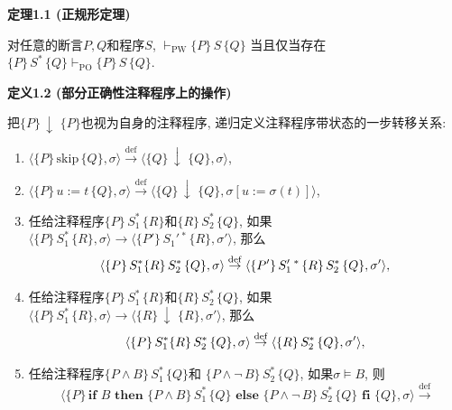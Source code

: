\documentclass[UTF8]{ctexart}
\begin{document}
\vspace{15pt}

\hypertarget{sec:定理1.1}{}
\noindent\textbf{定理1.1 (正规形定理)}

对任意的断言$P,Q$和程序$S$, $\vdash_{\mathrm{PW}}\{P\}\,S\,\{Q\}$
当且仅当存在$\{P\}\,S^*\,\{Q\}\vdash_{\mathrm{PO}}\{P\}\,S\,\{Q\}$.

\vspace{15pt}

\hypertarget{sec:定义1.2}{}
\noindent\textbf{定义1.2 (部分正确性注释程序上的操作)}

把$\{P\}\,\downarrow\,\,\{P\}$也视为自身的注释程序,
递归定义注释程序带状态的一步转移关系:
\begin{enumerate}
    \item $\langle\{P\}\,\mathrm{skip}\,\{Q\},\sigma\rangle
    \overset{\mathrm{def}}{\to}
    \langle\{Q\}\,\downarrow\,\,\{Q\},\sigma\rangle$,
    \item $\langle\{P\}\,u:=t\,\{Q\},\sigma\rangle\overset{\mathrm{def}}{\to}
    \langle\{Q\}\,\downarrow\,\,\{Q\},\sigma[u:=\sigma(t)]\rangle$,
    \vspace{3pt}
    \item 任给注释程序$\{P\}\,S_1^*\,\{R\}$和$\{R\}\,S_2^*\,\{Q\}$,
    如果$\langle\{P\}\,S_1^*\,\{R\},\sigma\rangle\to
    \langle\{P'\}\,S_1'\,^*\,\{R\},\sigma'\rangle$, 那么
    \vspace{1pt}
    \[
        \langle\{P\}\,S_1^*\{R\}\,S_2^*\,\{Q\},\sigma\rangle
        \overset{\mathrm{def}}{\to}
        \langle\{P'\}\,S_1'\,^*\,\{R\}\,S_2^*\,\{Q\},\sigma'\rangle,\\[1pt]
    \]
    \item 任给注释程序$\{P\}\,S_1^*\,\{R\}$和$\{R\}\,S_2^*\,\{Q\}$,
    如果$\langle\{P\}\,S_1^*\,\{R\},\sigma\rangle\to
    \langle\{R\}\,\downarrow\,\,\{R\},\sigma'\rangle$, 那么
    \vspace{1pt}
    \[
        \langle\{P\}\,S_1^*\{R\}\,S_2^*\,\{Q\},\sigma\rangle
        \overset{\mathrm{def}}{\to}
        \langle\{R\}\,S_2^*\,\{Q\},\sigma'\rangle,\\[1pt]
    \]
    \item 任给注释程序$\{P\land B\}\,S_1^*\,\{Q\}$和
    $\{P\land\neg\,B\}\,S_2^*\,\{Q\}$, 如果$\sigma\models B$, 则
    \vspace{1pt}
    \[
        \,\,\langle\{P\}\,\mathbf{if}\,\,B\,\,\mathbf{then}\,\,
        \{P\land B\}\,S_1^*\,\{Q\}\,\,\mathbf{else}\,\,\{P\land\neg\,B\}\,S_2^*
        \,\{Q\}\,\,\mathbf{fi}\,\,\{Q\},\sigma\rangle\overset{\mathrm{def}}{\to}
\]
\end{enumerate}
\end{document}
